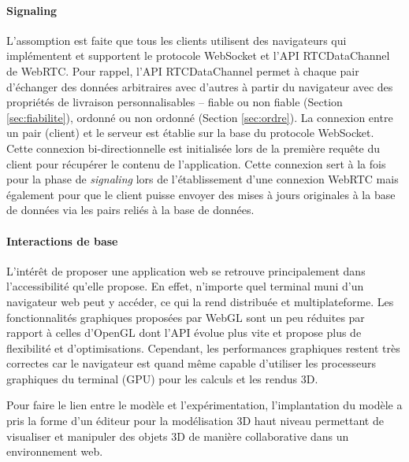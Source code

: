 \paragraph{Signaling}
L'assomption est faite que tous les clients utilisent des navigateurs qui 
implémentent et supportent le protocole WebSocket et l'\gls{API} 
RTCDataChannel de WebRTC. Pour rappel, l'\gls{API} RTCDataChannel permet à 
chaque pair d'échanger des données arbitraires 
avec d'autres à partir du navigateur avec des propriétés de livraison 
personnalisables -- fiable ou non fiable (Section \ref{sec:fiabilite}), ordonné ou non 
ordonné (Section \ref{sec:ordre}). 
La connexion entre un pair (client) et le serveur est établie sur la base du protocole 
\gls{WebSocket}. Cette connexion bi-directionnelle est initialisée lors de la 
première requête du client pour récupérer le contenu de l'application. Cette 
connexion sert à la fois pour la phase de \textit{signaling} lors de l'établissement 
d'une connexion \gls{WebRTC} mais également pour que le client puisse envoyer 
des mises à jours originales à la base de données via les pairs reliés à la base de 
données. 


\paragraph{Interactions de base}
L'intérêt de proposer une application web se retrouve principalement dans 
l'accessibilité qu'elle propose. 
En effet, n'importe quel terminal muni d'un navigateur web peut y accéder, ce qui 
la rend distribuée et multiplateforme. 
Les fonctionnalités graphiques proposées par WebGL sont un peu réduites par 
rapport à celles d'OpenGL dont l'\gls{API} évolue plus vite et propose plus de 
flexibilité et d'optimisations. Cependant, les performances graphiques restent très 
correctes car le navigateur est quand même capable d'utiliser les processeurs 
graphiques du terminal (GPU) pour les calculs et les rendus \gls{3D}.

Pour faire le lien entre le modèle et l'expérimentation, l'implantation du modèle a 
pris la forme d'un éditeur pour la modélisation \gls{3D} haut niveau permettant de 
visualiser et manipuler des objets \gls{3D} de manière collaborative dans un 
environnement web.

